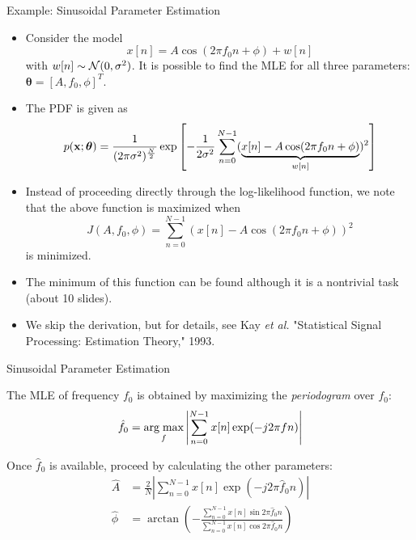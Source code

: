 \documentclass[10pt, aspectratio=169]{beamer} %
\newcommand{\argmax}{\mathop{\text{arg\;max}}}
\newcommand{\thb}{\boldsymbol{\theta}}
\newcommand{\x}{{\bf x}}
\begin{document}
\begin{frame}[allowframebreaks=0.8]
{Example: Sinusoidal Parameter Estimation}

\begin{itemize}
\item Consider the model
\[
 x[n] = A\cos(2\pi f_0 n + \phi) + w[n]
\]
with $w[n]\sim {\cal N}(0,\sigma^2)$. It is possible to find the MLE for all three parameters:
$\thb = [A, f_0, \phi]^T$.
\item The PDF is given as
\[
 p(\x;\thb) = \frac{1}{(2\pi\sigma^2)^{\frac N2}} \exp \left[ -\frac{1}{2\sigma^2}\sum_{n=0}^{N-1}(\underbrace{x[n]-A\cos(2\pi f_0 n + \phi)}_{w[n]})^2 \right]
\]
\item Instead of proceeding directly through the log-likelihood function, we note that the above function
is maximized when
\[
J(A, f_0,\phi) = \sum_{n=0}^{N-1}(x[n]-A\cos(2\pi f_0 n + \phi))^2
\]
is minimized.
\item The minimum of this function can be found although it is a nontrivial task (about 10 slides). 
\item We skip the derivation, but for details, see Kay \emph{et al.} "Statistical Signal Processing: Estimation Theory," 1993.
\end{itemize}
\end{frame}
\begin{frame}{Sinusoidal Parameter Estimation}
\begin{itemize}
{\small
\item The MLE of frequency $f_0$ is obtained by maximizing the \textit{periodogram} over $f_0$:
\[
 \hat{f}_0 = \argmax_{f}\left|\sum_{n=0}^{N-1}x[n]\exp( -j 2\pi f n)\right|
\]
\item Once $\hat{f}_0$ is available, proceed by calculating the other parameters:
\begin{align*}
 \hat{A} &= \frac 2N \left|\sum_{n=0}^{N-1}x[n]\exp( -j 2\pi \hat{f}_0 n)\right|\\
\hat{\phi} &= \arctan \left(-\frac{\sum\limits_{n=0}^{N-1}x[n]\sin 2\pi \hat{f}_0 n}{\sum\limits_{n=0}^{N-1}x[n]\cos 2\pi \hat{f}_0 n}\right) 
\end{align*}
}
\end{itemize}
\end{frame}
\end{document}
